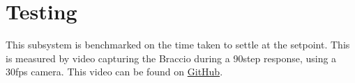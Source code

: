 \section{Testing}
This subsystem is benchmarked on the time taken to settle at the setpoint. This is measured by video capturing the Braccio during a 90\degree step response, using a 30fps camera. This video can be found on \href{https://github.com/Neo-Vorsatz-UCT/eee4022s/blob/main/data/actuation_data.mp4}{GitHub}.
